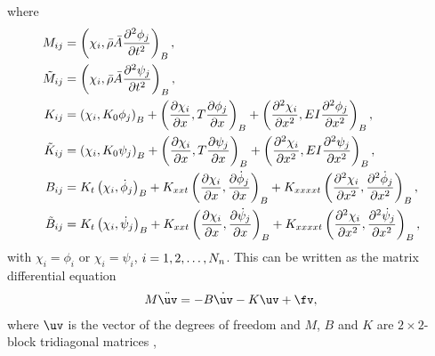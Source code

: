 \documentclass[11pt]{article}
\newcommand{\rhos}{\bar{\rho}}
\newcommand{\As}{\bar{A}}
\begin{document}
where 
\begin{align}
  M_{ij} &= \left( \chi_i,  \rhos \As \frac{\partial^2 \phi_j}{\partial t^2} \right)_B , \\
  \Mt_{ij} &= \left( \chi_i,  \rhos \As \frac{\partial^2 \psi_j}{\partial t^2} \right)_B , \\
% 
  K_{ij} &= 
             \left( \chi_i , K_0 \phi_j \right)_B
            + \left( \frac{\partial \chi_i}{\partial x} , T \frac{\partial \phi_j}{\partial x} \right)_B
               + \left(\frac{\partial^2 \chi_i}{\partial x^2}, E I \frac{\partial^2 \phi_j}{\partial x^2}\right)_B, \\
  \Kt_{ij} &= \left( \chi_i , K_0 \psi_j \right)_B
                + \left( \frac{\partial \chi_i}{\partial x} , T \frac{\partial \psi_j}{\partial x} \right)_B
                + \left(\frac{\partial^2 \chi_i}{\partial x^2}, E I \frac{\partial^2 \psi_j}{\partial x^2}\right)_B, \\
% 
  B_{ij} &=  K_t \left( \chi_i , \dot\phi_j \right)_B
            + K_{xxt} \left( \frac{\partial \chi_i}{\partial x} , \frac{\partial \dot\phi_j}{\partial x} \right)_B 
            + K_{xxxxt} \left(\frac{\partial^2 \chi_i}{\partial x^2}, \frac{\partial^2 \dot\phi_j}{\partial x^2}\right)_B, \\
% 
  \Bt_{ij} &=  K_t \left( \chi_i , \dot\psi_j \right)_B
            + K_{xxt} \left( \frac{\partial \chi_i}{\partial x} , \frac{\partial \dot\psi_j}{\partial x} \right)_B
            + K_{xxxxt} \left(\frac{\partial^2 \chi_i}{\partial x^2}, \frac{\partial^2 \dot\psi_j}{\partial x^2}\right)_B ,  
\end{align}
with $\chi_i=\phi_i$ or $\chi_i=\psi_i$, $i=1,2,\ldots,N_n$.
This can be written as the matrix differential equation
\begin{align}
   M \ddot\uv = - B \dot\uv - K \uv + \fv , \label{eq:beamODE}
\end{align}
where $\uv$ is the vector of the degrees of freedom and 
$M$, $B$ and $K$ are $2\times2$-block tridiagonal matrices , 
\end{document}
